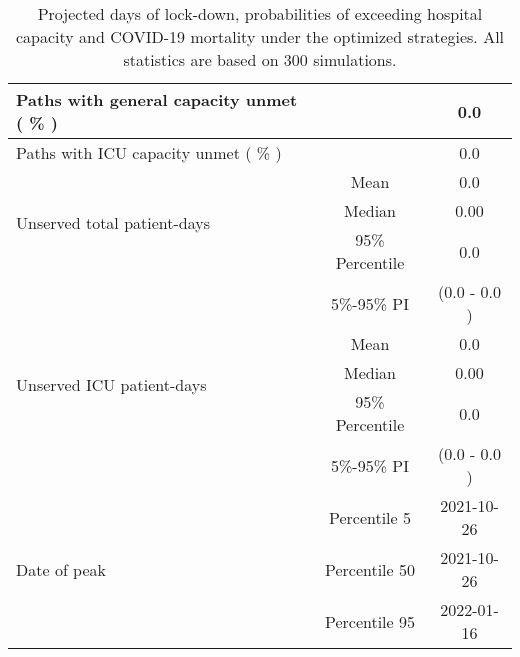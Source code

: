 \documentclass{article}
\begin{document}
\begin{table}[th]
\begin{tabular}{p{4cm}cc}
\multirow{1}{*}{Paths with general capacity unmet ( \% )} &      &         0.0              \\   \midrule 
\multirow{1}{*}{Paths with ICU capacity unmet ( \% )} &      &         0.0              \\   \midrule 
\multirow{3}{\hsize}{Unserved total patient-days} & Mean & 0.0  \\ \cmidrule(l){2-3}
									& Median & 0.00  \\ \cmidrule(l){2-3} 
									& 95\% Percentile     & 0.0    \\ \cmidrule(l){2-3} 
									& 5\%-95\% PI & (0.0 - 0.0 )       \\ \midrule
\multirow{3}{\hsize}{Unserved ICU patient-days} & Mean & 0.0  \\ \cmidrule(l){2-3}
									& Median & 0.00  \\ \cmidrule(l){2-3} 
									& 95\% Percentile     & 0.0    \\ \cmidrule(l){2-3} 
									& 5\%-95\% PI & (0.0 - 0.0 )       \\ \midrule
									
\multirow{3}{\hsize}{Date of peak}   & Percentile 5      & 2021-10-26   \\ \cmidrule(l){2-3} 
                                     & Percentile 50     & 2021-10-26    \\ \cmidrule(l){2-3} 
                                     & Percentile 95     & 2022-01-16     \\  \bottomrule

\end{tabular}
\caption{Projected days of lock-down, probabilities of exceeding hospital capacity and COVID-19 mortality under the optimized strategies. All statistics are based on 300 simulations.}

\label{table:summary_table}
\end{table}
\end{document}
